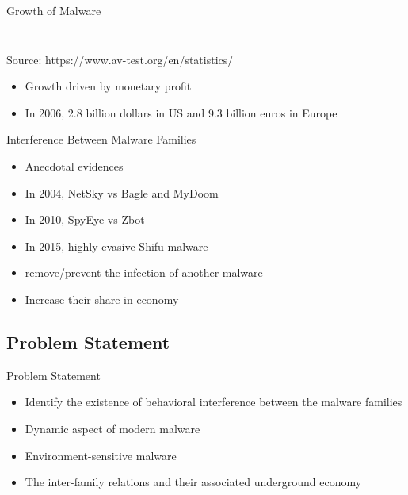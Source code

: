 \documentclass{beamer}
\begin{document}
\begin{frame}[plain,t]{Growth of Malware}
\begin{columns}
\begin{column}{5cm}
\begin{figure}[t]
\begin{center}
        \end{center}
      \end{figure}
    \end{column}
  \end{columns}
  \begin{center}
  \tiny Source: https://www.av-test.org/en/statistics/
  \end{center}
  \begin{itemize}
    \item Growth driven by monetary profit
    \item In 2006, 2.8 billion dollars in US and 9.3 billion euros in Europe
  \end{itemize}
\end{frame}
\begin{frame}[h]{Interference Between Malware Families}
  \begin{itemize}
    \item Anecdotal evidences
    \item In 2004, NetSky vs Bagle and MyDoom
    \item In 2010, SpyEye vs Zbot
    \item In 2015, highly evasive Shifu malware
    \item remove/prevent the infection of another malware
    \item Increase their share in economy
  \end{itemize}
\end{frame}
\subsection{Problem Statement}
\label{sub:Problem Statement}
\begin{frame}[h]{Problem Statement}
\begin{itemize}
  \item Identify the existence of behavioral interference between the malware families
  \item Dynamic aspect of modern malware
  \item Environment-sensitive malware
  \item The inter-family relations and their associated underground economy
\end{itemize}
\end{frame}
\end{document}
